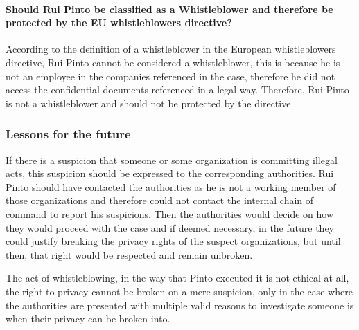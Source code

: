     
    
    \paragraph{Should Rui Pinto be classified as a Whistleblower and therefore be protected by the EU whistleblowers directive?}
    According to the definition of a whistleblower in the European whistleblowers directive, Rui Pinto cannot be considered a whistleblower, this is because he is not an employee in the companies referenced in the case, therefore he did not access the confidential documents referenced in a legal way.
    Therefore, Rui Pinto is not a whistleblower and should not be protected by the directive.

    \subsubsection{Lessons for the future}
    If there is a suspicion that someone or some organization is committing illegal acts, this suspicion should be expressed to the corresponding authorities.
    Rui Pinto should have contacted the authorities as he is not a working member of those organizations and therefore could not contact the internal chain of command to report his suspicions.
    Then the authorities would decide on how they would proceed with the case and if deemed necessary, in the future they could justify breaking the privacy rights of the suspect organizations, but until then, that right would be respected and remain unbroken.
    
    The act of whistleblowing, in the way that Pinto executed it is not ethical at all, the right to privacy cannot be broken on a mere suspicion, only in the case where the authorities are presented with multiple valid reasons to investigate someone is when their privacy can be broken into.

